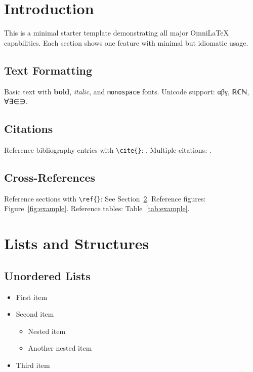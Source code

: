 \documentclass[
    language=english,
    doctype=book,              %
    institution=none,        %
    oneside,                 %
    loadGlossaries,          %
]{../../omnilatex}
\begin{document}
\maketitle

\tableofcontents

\chapter{Introduction}

This is a minimal starter template demonstrating all major OmniLaTeX capabilities.
Each section shows one feature with minimal but idiomatic usage.

\section{Text Formatting}

Basic text with \textbf{bold}, \textit{italic}, and \texttt{monospace} fonts.
Unicode support: αβγ, ℝℂℕ, ∀∃∈∋.

\section{Citations}

Reference bibliography entries with \verb|\cite{}|: \cite{einstein1905}.
Multiple citations: \cite{birdNaturalLanguageProcessing2009,goossensLaTeXCompanion1993}.

\section{Cross-References}

Reference sections with \verb|\ref{}|: See Section~\ref{sec:lists}.
Reference figures: Figure~\ref{fig:example}.
Reference tables: Table~\ref{tab:example}.

\chapter{Lists and Structures}
\label{sec:lists}

\section{Unordered Lists}

\begin{itemize}
	\item First item
	\item Second item
	      \begin{itemize}
		      \item Nested item
		      \item Another nested item
	      \end{itemize}
	\item Third item
\end{itemize}
\end{document}
